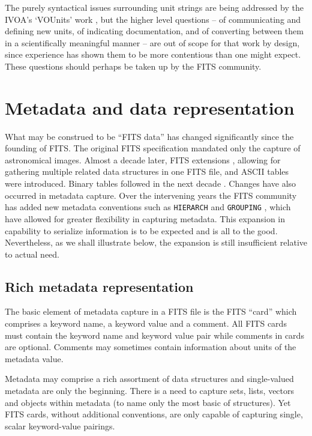 \documentclass[final,authoryear,5p,times,twocolumn]{elsarticle}
\begin{document}
{{The purely syntactical issues surrounding unit strings are
being addressed by the IVOA's `VOUnits' work \citep{VOUnits}, but the higher
level questions -- of communicating and defining new units, of
indicating documentation, and of converting between them in a
scientifically meaningful manner -- are out of scope for that work by
design, since experience has shown them to be more contentious than
one might expect.  These questions should perhaps be taken up by the FITS community.


\section{Metadata and data representation}
\label{section_inflex_represent}


What may be construed to be ``FITS data'' has changed significantly
since the founding of FITS. The original FITS specification mandated
only the capture of astronomical images. Almost a decade later, FITS
extensions \citep{1988A&AS...73..359G}, allowing for gathering
multiple related data structures in one FITS file, and ASCII tables
\citep{1988A&AS...73..365H} were introduced. Binary tables followed in
the next decade \citep{1995A&AS..113..159C}. Changes have also
occurred in metadata capture. Over the intervening years the FITS
community has added new metadata conventions such as \texttt{HIERARCH}
\citep{2009Wic} and \texttt{GROUPING} \citep{2007Jen,1995ASPC...77..229J}, which have
allowed for greater flexibility in capturing metadata.
This expansion in capability to serialize information is to be
expected and is all to the good. Nevertheless, as we shall illustrate
below, the expansion is still insufficient relative to actual need.


\subsection{Rich metadata representation}
\label{subsection_information_representation}


The basic element of metadata capture in a FITS file is the FITS
``card'' which comprises a keyword name, a keyword value and a
comment. All FITS cards must contain the keyword name and keyword
value pair while comments in cards are optional. Comments may
sometimes contain information about units of the metadata value.

Metadata may comprise a rich assortment of data structures and
single-valued metadata are only the beginning. There is a need to
capture sets, lists, vectors and objects within metadata (to name only
the most basic of structures). Yet FITS cards, without additional
conventions, are only capable of capturing single, scalar keyword-value
pairings.

}}
\end{document}
